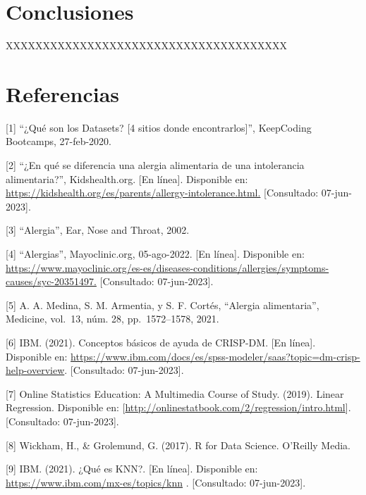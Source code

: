 \documentclass[
]{article}
\begin{document}
\hypertarget{conclusiones}{%
\section{Conclusiones}\label{conclusiones}}

XXXXXXXXXXXXXXXXXXXXXXXXXXXXXXXXXXXXXX

\hypertarget{referencias}{%
\section{Referencias}\label{referencias}}

{[}1{]} ``¿Qué son los Datasets? {[}4 sitios donde encontrarlos{]}'',
KeepCoding Bootcamps, 27-feb-2020.

{[}2{]} ``¿En qué se diferencia una alergia alimentaria de una
intolerancia alimentaria?'', Kidshealth.org. {[}En línea{]}. Disponible
en: \url{https://kidshealth.org/es/parents/allergy-intolerance.html.}
{[}Consultado: 07-jun-2023{]}.

{[}3{]} ``Alergia'', Ear, Nose and Throat, 2002.

{[}4{]} ``Alergias'', Mayoclinic.org, 05-ago-2022. {[}En línea{]}.
Disponible en:
\url{https://www.mayoclinic.org/es-es/diseases-conditions/allergies/symptoms-causes/syc-20351497.}
{[}Consultado: 07-jun-2023{]}.

{[}5{]} A. A. Medina, S. M. Armentia, y S. F. Cortés, ``Alergia
alimentaria'', Medicine, vol.~13, núm. 28, pp.~1572--1578, 2021.

{[}6{]} IBM. (2021). Conceptos básicos de ayuda de CRISP-DM. {[}En
línea{]}. Disponible en:
\url{https://www.ibm.com/docs/es/spss-modeler/saas?topic=dm-crisp-help-overview}.
{[}Consultado: 07-jun-2023{]}.

{[}7{]} Online Statistics Education: A Multimedia Course of Study.
(2019). Linear Regression. Disponible en:
{[}\url{http://onlinestatbook.com/2/regression/intro.html}{]}.
{[}Consultado: 07-jun-2023{]}.

{[}8{]} Wickham, H., \& Grolemund, G. (2017). R for Data Science.
O'Reilly Media.

{[}9{]} IBM. (2021). ¿Qué es KNN?. {[}En línea{]}. Disponible en:
\url{https://www.ibm.com/mx-es/topics/knn} . {[}Consultado:
07-jun-2023{]}.
\end{document}

